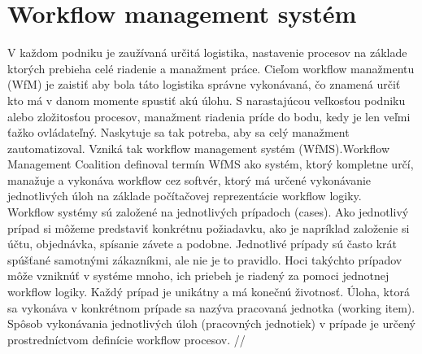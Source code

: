 
\section{Workflow management systém}
V každom podniku je zaužívaná určitá logistika, nastavenie procesov na základe ktorých prebieha celé riadenie a manažment práce. Cieľom workflow manažmentu (WfM) je zaistiť aby bola táto logistika správne vykonávaná, čo znamená určiť kto má v danom momente spustiť akú úlohu. S narastajúcou veľkosťou podniku alebo zložitosťou procesov, manažment riadenia príde do bodu, kedy je len veľmi ťažko ovládateľný. Naskytuje sa tak potreba, aby sa celý manažment zautomatizoval. Vzniká tak workflow management systém (WfMS).Workflow Management Coalition definoval termín WfMS ako systém, ktorý kompletne určí, manažuje a vykonáva workflow cez softvér, ktorý má určené vykonávanie jednotlivých úloh na základe počítačovej reprezentácie workflow logiky. \cite{aalst}\\



Workflow systémy sú založené na jednotlivých prípadoch (cases). Ako jednotlivý prípad si môžeme predstaviť konkrétnu požiadavku, ako je napríklad založenie si účtu, objednávka, spísanie závete a podobne. Jednotlivé prípady sú často krát spúšťané samotnými zákazníkmi, ale nie je to pravidlo. Hoci takýchto prípadov môže vzniknúť v systéme mnoho, ich priebeh je riadený za pomoci jednotnej workflow logiky. Každý prípad je unikátny a má konečnú životnosť.  Úloha, ktorá sa vykonáva v konkrétnom prípade sa nazýva pracovaná jednotka (working item).
Spôsob vykonávania jednotlivých úloh (pracovných jednotiek) v prípade  je určený prostredníctvom definície workflow procesov. \cite{aalst}  //  


